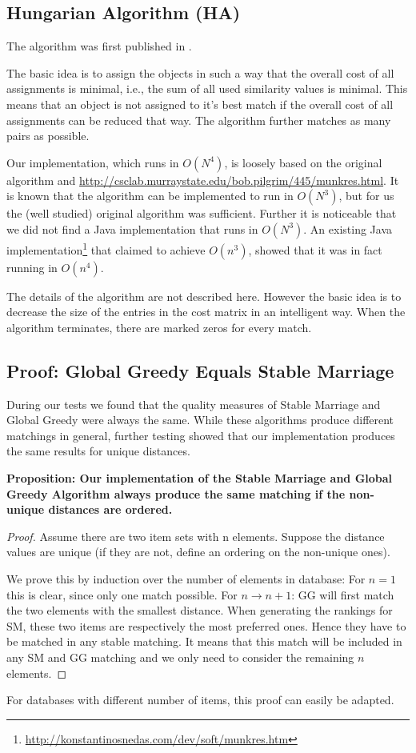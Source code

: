 \documentclass[a4paper,11pt]{article}
\begin{document}
\subsection{Hungarian Algorithm (HA)}

The algorithm was first published in \cite{ha_firstpub}.

The basic idea is to assign the objects in such a way that the overall cost of all assignments is minimal, i.e., the sum of all used similarity values is minimal. This means that an object is not assigned to it's best match if the overall cost of all assignments can be reduced that way. The algorithm further matches as many pairs as possible.

Our implementation, which runs in $O(N^4)$, is loosely based on the original algorithm and  \url{http://csclab.murraystate.edu/bob.pilgrim/445/munkres.html}. It is known that the algorithm can be implemented to run in $O(N^3)$, but for us the (well studied) original algorithm was sufficient. Further it is noticeable that we did not find a Java implementation that runs in $O(N^3)$. An existing Java implementation\footnote{\url{http://konstantinosnedas.com/dev/soft/munkres.htm}} that claimed to achieve $O(n^{3})$, showed that it was in fact running in $O(n^{4})$.

The details of the algorithm are not described here. However the basic idea is to decrease the size of the entries in the cost matrix in an intelligent way. When the algorithm terminates, there are marked zeros for every match. 

\subsection{Proof: Global Greedy Equals Stable Marriage}

During our tests we found that the quality measures of Stable Marriage and Global Greedy were
always the same. While these algorithms produce different matchings in general, further testing showed
that our implementation produces the same results for unique distances.

\textbf{Proposition: Our implementation of the Stable Marriage and Global Greedy Algorithm always produce the same matching if the non-unique distances are ordered.}
\begin{proof}
Assume there are two item sets with n elements.
Suppose the distance values are unique
(if they are not, define an ordering on the non-unique ones).

We prove this by induction over the number of elements in database:
For $n = 1$ this is clear, since only one match possible.
For $n \rightarrow n + 1$: 
GG will first match the two elements with the smallest distance.
When generating the rankings for SM, these two items are respectively the most preferred ones.
Hence they have to be matched in any stable matching.
It means that this match will be included in any SM and GG matching
and we only need to consider the remaining $n$ elements.
\end{proof}
For databases with different number of items, this proof can easily be adapted.
\end{document}
